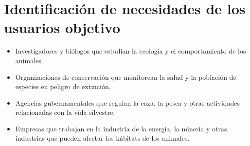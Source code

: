 
\begin{comment}
    \section{Descripción de los usuarios potenciales}
    Definir al usuario o conjunto de usuarios sobre los que se identificaron las necesidades que motivaron el desarrollo del proyecto. \\
    
    Estas pueden ser algunas preguntas orientadoras:
    
    \begin{itemize}
        \item ¿Quién es, cómo es, dónde vive, cómo vive, cuál es su perfil familiar, laboral, motivacional, emocional, etc.?
        \item ¿Cuál es la historia que acompaña a los usuarios objetivo? 
        \item ¿Existen conexiones con otros actores dentro del ambiente que rodea al usuario?
    \end{itemize}
    
    Los usuarios potenciales del sistema podrían incluir cualquier persona interesada en conocer más sobre la vida silvestre y la ecología de su área local o de otras regiones. También podrían incluir estudiantes y educadores que utilizan los datos recolectados para enseñar y aprender sobre la vida silvestre y la conservación. 
\end{comment}


\section{Identificación de necesidades de los usuarios objetivo}

\begin{itemize}
    \item Investigadores y biólogos que estudian la ecología y el comportamiento de los animales.
    \item Organizaciones de conservación que monitorean la salud y la población de especies en peligro de extinción.
    \item Agencias gubernamentales que regulan la caza, la pesca y otras actividades relacionadas con la vida silvestre.
    \item Empresas que trabajan en la industria de la energía, la minería y otras industrias que pueden afectar los hábitats de los animales.
\end{itemize}

